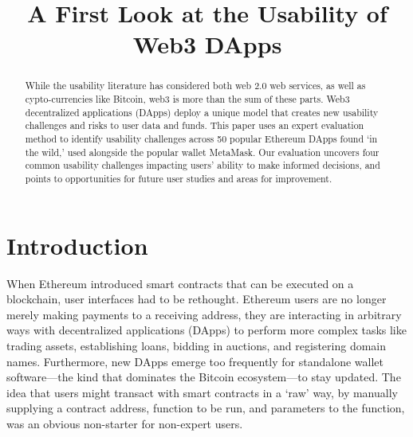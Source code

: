 \documentclass[conference]{IEEEtran}
\begin{document}
%
\title{A First Look at the Usability of Web3 DApps}
%
%
\author{}
%
%
\maketitle              %
%
\begin{abstract}
While the usability literature has considered both web 2.0 web services, as well as cypto-currencies like Bitcoin, web3 is more than the sum of these parts. Web3 decentralized applications (DApps) deploy a unique model that creates new usability challenges and risks to user data and funds.
This paper uses an expert evaluation method to identify usability challenges across 50 popular Ethereum DApps found `in the wild,' used alongside the popular wallet MetaMask.
Our evaluation uncovers four common usability challenges impacting users' ability to make informed decisions, and points to opportunities for future user studies and areas for improvement.
\end{abstract}
%
%
%
\section{Introduction}



When Ethereum introduced smart contracts that can be executed on a blockchain, user interfaces had to be rethought. Ethereum users are no longer merely making payments to a receiving address, they are interacting in arbitrary ways with decentralized applications (DApps) to perform more complex tasks like trading assets, establishing loans, bidding in auctions, and registering domain names. Furthermore, new DApps emerge too frequently for standalone wallet software---the kind that dominates the Bitcoin ecosystem---to stay updated. The idea that users might transact with smart contracts in a `raw' way, by manually supplying a contract address, function to be run, and parameters to the function, was an obvious non-starter for non-expert users. 
\end{document}
